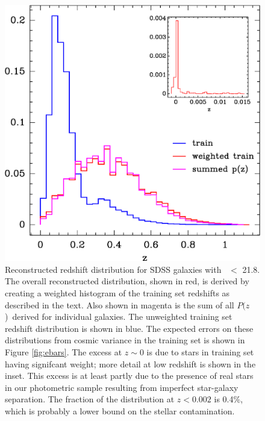 \documentclass[preprint]{aastex}
\newcommand{\rmax}{21.8}
\newcommand{\pofz}{$P(z$)}
\begin{document}
\begin{figure}[p] \centering
    \includegraphics[scale=0.9]{figures/zweight-10-zhist-withorig-withsum-12.eps}

    \caption{Reconstructed redshift distribution for SDSS galaxies with \rmag\
    $ < $ \rmax.  The overall reconstructed distribution, shown in red, is
    derived by creating a weighted histogram of the training set redshifts as
    described in the text.  Also shown in magenta is the sum of all \pofz\
    derived for individual galaxies.  The unweighted training set redshift
    distribution is shown in blue.  The expected errors on these distributions
    from cosmic variance in the training set is shown in Figure
    \ref{fig:ebars}. The excess at $z \sim 0$ is due to stars in training set
    having signifcant weight; more detail at low redshift is shown in the
    inset.  This excess is at least partly due to the presence of real stars in
    our photometric sample resulting from imperfect star-galaxy separation.
    The fraction of the distribution at $z < 0.002$ is 0.4\%, which is probably
    a lower bound on the stellar contamination.  \label{fig:pofz}}

    \vspace{2em}
\end{figure}
\end{document}
